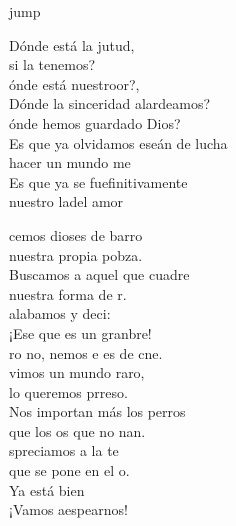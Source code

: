 \begin{cancion}jump\\
	\begin{chorus}%
		Dónde está la jutud,\\
	\jump
	si la tenemos?\\
		ónde está nuestroor?,\\
		Dónde la sinceridad  alardeamos?\\
		ónde hemos guardado Dios?\\
		Es que ya olvidamos eseán de lucha\\
		 hacer un mundo me \\
		Es que ya se fuefinitivamente\\
		nuestro ladel amor \jump\\
	\end{chorus}%
	cemos dioses de barro\\
	 nuestra propia pobza.\\
	\jump
Buscamos a aquel que cuadre\\
	 nuestra forma de r.\\
	 alabamos y deci:\\
	¡Ese que es un granbre!\\
	ro no, nemos e es de cne.\\
	\jump
	vimos un mundo raro,\\
	lo queremos prreso.\\
	\jump
Nos importan más los perros\\
	que los os que no nan.\\
	spreciamos a la te\\
	que se pone en el o.\\
	Ya está bien \\
	¡Vamos aespearnos!\\
\end{cancion}%
